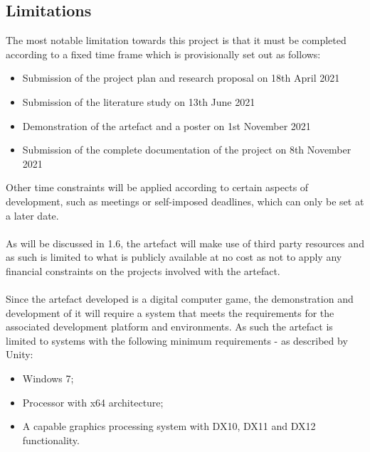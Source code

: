 \subsection{Limitations}
The most notable limitation towards this project is that it must be completed according to a fixed time frame which is provisionally set out as follows:
\begin{itemize}
\item Submission of the project plan and research proposal on 18th April 2021
\item Submission of the literature study on 13th June 2021
\item Demonstration of the artefact and a poster on 1st November 2021
\item Submission of the complete documentation of the project on 8th November 2021
\end{itemize}
Other time constraints will be applied according to certain aspects of development, such as meetings or self-imposed deadlines, which can only be set at a later date.
\\\\
As will be discussed in 1.6, the artefact will make use of third party resources and as such is limited to what is publicly available at no cost as not to apply any financial constraints on the projects involved with the artefact.
\\\\
Since the artefact developed is a digital computer game, the demonstration and development of it will require a system that meets the requirements for the associated development platform and environments. As such the artefact is limited to systems with the following minimum requirements - as described by Unity:
\begin{itemize}
\item Windows 7;
\item Processor with x64 architecture;
\item A capable graphics processing system with DX10, DX11 and DX12 functionality.
\end{itemize}

